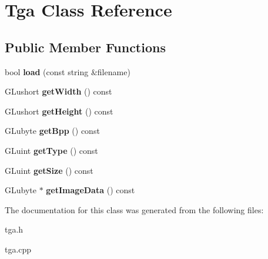 \hypertarget{class_tga}{
\section{Tga Class Reference}
\label{class_tga}
}
\subsection*{Public Member Functions}
\begin{DoxyCompactItemize}
\item 
\hypertarget{class_tga_a4a90815b4845e49f47266e05120b5f01}{
bool {\bfseries load} (const string \&filename)}
\label{class_tga_a4a90815b4845e49f47266e05120b5f01}

\item 
\hypertarget{class_tga_a6b7d3ffa450c93adea5fcfc73d9ba048}{
GLushort {\bfseries getWidth} () const }
\label{class_tga_a6b7d3ffa450c93adea5fcfc73d9ba048}

\item 
\hypertarget{class_tga_ac75c2fee8195aa83a4d3326092dae6c6}{
GLushort {\bfseries getHeight} () const }
\label{class_tga_ac75c2fee8195aa83a4d3326092dae6c6}

\item 
\hypertarget{class_tga_a664f08061efa30df33137f65e673ccdd}{
GLubyte {\bfseries getBpp} () const }
\label{class_tga_a664f08061efa30df33137f65e673ccdd}

\item 
\hypertarget{class_tga_ac10b23f3abdc60399f2bdacd677958e8}{
GLuint {\bfseries getType} () const }
\label{class_tga_ac10b23f3abdc60399f2bdacd677958e8}

\item 
\hypertarget{class_tga_a84a022d92a1ee5704162aecaba5e1760}{
GLuint {\bfseries getSize} () const }
\label{class_tga_a84a022d92a1ee5704162aecaba5e1760}

\item 
\hypertarget{class_tga_a85781d2c04a1c838089b8b927c5a4c90}{
GLubyte $\ast$ {\bfseries getImageData} () const }
\label{class_tga_a85781d2c04a1c838089b8b927c5a4c90}

\end{DoxyCompactItemize}


The documentation for this class was generated from the following files:\begin{DoxyCompactItemize}
\item 
tga.h\item 
tga.cpp\end{DoxyCompactItemize}
